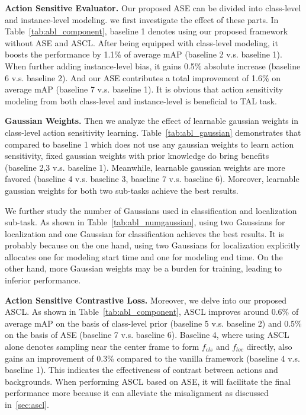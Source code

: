 \documentclass[10pt,twocolumn,letterpaper]{article}
\begin{document}
 \textbf{Action Sensitive Evaluator.}  Our proposed ASE can be divided into class-level and instance-level modeling. we first investigate the effect of these parts. In Table~\ref{tab:abl_component}, baseline 1 denotes using our proposed framework without ASE and ASCL. After being equipped with class-level modeling, it boosts the performance by 1.1\% of average mAP (baseline 2 v.s. baseline 1). When further adding instance-level bias, it gains 0.5\% absolute increase (baseline 6 v.s. baseline 2). And our ASE contributes a total improvement of 1.6\% on average mAP (baseline 7 v.s. baseline 1). It is obvious that action sensitivity modeling from both class-level and instance-level is beneficial to TAL task.

\textbf{Gaussian Weights.} Then we analyze the effect of learnable gaussian weights in class-level action sensitivity learning. Table~\ref{tab:abl_gaussian} demonstrates that compared to baseline 1 which does not use any gaussian weights to learn action sensitivity, fixed gaussian weights with prior knowledge do bring benefits (baseline 2,3 v.s. baseline 1). Meanwhile, learnable gaussian weights are more favored (baseline 4 v.s. baseline 3, baseline 7 v.s. baseline 6). Moreover, learnable gaussian weights for both two sub-tasks achieve the best results. 
\par We further study the number of Gaussians used in classification and localization sub-task. As shown in Table~\ref{tab:abl_numgaussian}, using two Gaussians for localization and one Gaussian for classification achieves the best results. It is probably because on the one hand, using two Gaussians for localization explicitly allocates one for modeling start time and one for modeling end time. On the other hand, more Gaussian weights may be a burden for training, leading to inferior performance. 



\textbf{Action Sensitive Contrastive Loss.} Moreover, we delve into our proposed ASCL. As shown in Table~\ref{tab:abl_component}, ASCL improves around 0.6\% of average mAP on the basis of class-level prior (baseline 5 v.s. baseline 2) and 0.5\% on the basis of ASE (baseline 7 v.s. baseline 6). Baseline 4, where using ASCL alone denotes sampling near the center frame to form $f_{cls}$ and $f_{loc}$ directly, also gains an improvement of 0.3\% compared to the vanilla framework (baseline 4 v.s. baseline 1). This indicates the effectiveness of contrast between actions and backgrounds. When performing ASCL based on ASE, it will facilitate the final performance more because it can alleviate the misalignment as discussed in~\ref{sec:ascl}.
\end{document}
